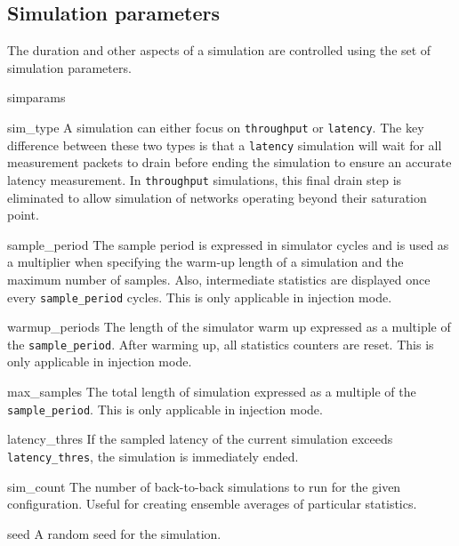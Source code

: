 \documentclass[11pt]{article}
\begin{document}
{\subsection{Simulation parameters}
\label{sec:sim_params}

The duration and other aspects of a simulation are controlled using
the set of simulation parameters.

\begin{opt_list}{simparams}

\item[sim\_type] A simulation can either focus on
\texttt{throughput} or \texttt{latency}.  The key difference between
these two types is that a \texttt{latency} simulation will wait for
all measurement packets to drain before ending the simulation to
ensure an accurate latency measurement.  In \texttt{throughput}
simulations, this final drain step is eliminated to allow simulation
of networks operating beyond their saturation point.

\item[sample\_period] The sample period is expressed in simulator
cycles and is used as a multiplier when specifying the warm-up length
of a simulation and the maximum number of samples.  Also, intermediate
statistics are displayed once every \texttt{sample\_period} cycles. This is only applicable in injection mode.

\item[warmup\_periods] The length of the simulator warm up expressed
as a multiple of the \texttt{sample\_period}.  After warming up, all
statistics counters are reset. This is only applicable in injection mode.

\item[max\_samples] The total length of simulation expressed as a
multiple of the \texttt{sample\_period}. This is only applicable in injection mode.

\item[latency\_thres] If the sampled latency of the current simulation
exceeds \texttt{latency\_thres}, the simulation is immediately ended.

\item[sim\_count] The number of back-to-back simulations to run for the
given configuration.  Useful for creating ensemble averages of
particular statistics.

\item[seed] A random seed for the simulation.



\end{opt_list}}
\end{document}
